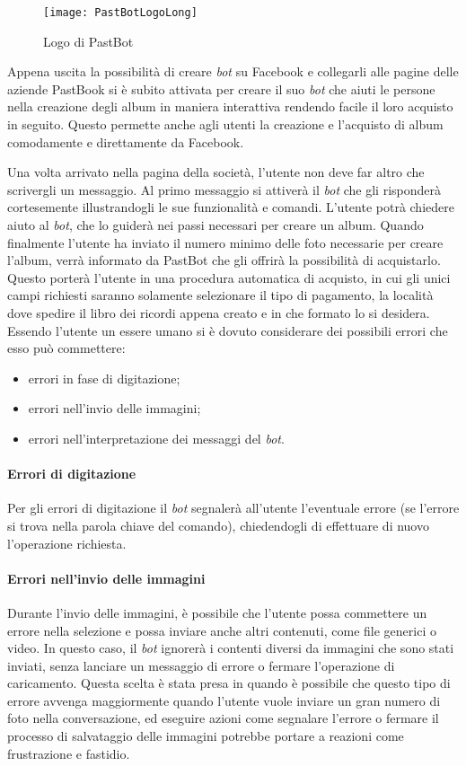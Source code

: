 \begin{figure}[H]
  \centering
  \texttt{[image: PastBotLogoLong]}
  \caption{Logo di PastBot}
\end{figure}
Appena uscita la possibilità di creare \textit{bot} su Facebook e collegarli
alle pagine delle aziende PastBook si è subito attivata per creare il suo
\textit{bot} che aiuti le persone nella creazione degli album in maniera
interattiva rendendo facile il loro acquisto in seguito. Questo permette anche
agli utenti la creazione e l'acquisto di album comodamente e direttamente da
Facebook.

Una volta arrivato nella pagina della società, l'utente non deve far altro che
scrivergli un messaggio. Al primo messaggio si attiverà il \textit{bot} che
gli risponderà cortesemente illustrandogli le sue funzionalità e comandi.
L'utente potrà chiedere aiuto al \textit{bot}, che lo guiderà nei passi
necessari per creare un album. Quando finalmente l'utente ha inviato il numero
minimo delle foto necessarie per creare l'album, verrà informato da PastBot che
gli offrirà la possibilità di acquistarlo. Questo porterà l'utente in una
procedura automatica di acquisto, in cui gli unici campi richiesti saranno
solamente selezionare il tipo di pagamento, la località dove spedire il libro
dei ricordi appena creato e in che formato lo si desidera. \\

Essendo l'utente un essere umano si è dovuto considerare dei possibili errori
che esso può commettere:
\begin{itemize}
  \item errori in fase di digitazione;
  \item errori nell'invio delle immagini;
  \item errori nell'interpretazione dei messaggi del \textit{bot}.
\end{itemize}

\paragraph*{Errori di digitazione} Per gli errori di digitazione il \textit{bot}
segnalerà all'utente l'eventuale errore (se l'errore si trova nella parola
chiave del comando), chiedendogli di effettuare di nuovo l'operazione richiesta.

\paragraph*{Errori nell'invio delle immagini} Durante l'invio delle immagini, è
possibile che l'utente possa commettere un errore nella selezione e possa
inviare anche altri contenuti, come file generici o video. In questo caso, il
\textit{bot} ignorerà i contenti diversi da immagini che sono stati inviati,
senza lanciare un messaggio di errore o fermare l'operazione di caricamento.
Questa scelta è stata presa in quando è possibile che questo tipo di errore
avvenga maggiormente quando l'utente vuole inviare un gran numero di foto nella
conversazione, ed eseguire azioni come segnalare l'errore o fermare il processo
di salvataggio delle immagini potrebbe portare a reazioni come frustrazione e
fastidio.

